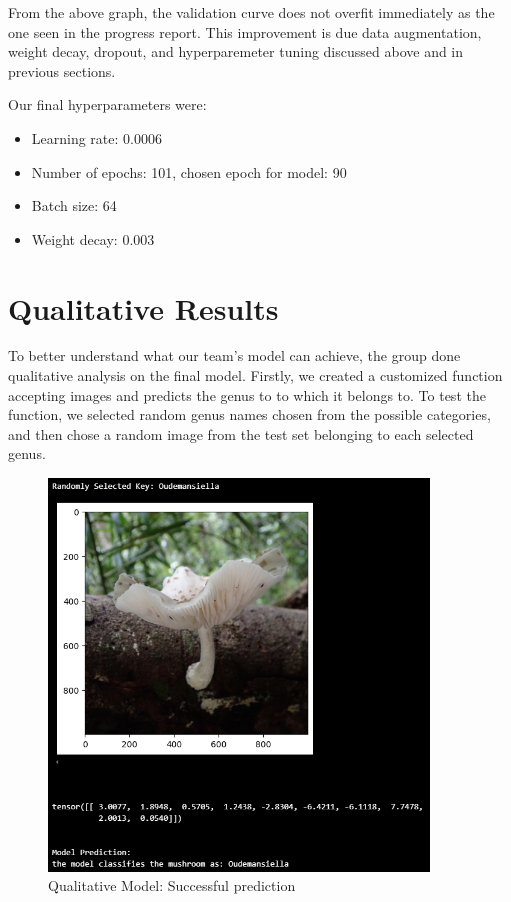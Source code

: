\documentclass{article} %
\begin{document}
From the above graph, the validation curve does not overfit immediately as the one seen in the progress report. This improvement is due data augmentation, weight decay, dropout, and hyperparemeter tuning discussed above and in previous sections. 

Our final hyperparameters were:
\begin{itemize}
    \item Learning rate: 0.0006
    \item Number of epochs: 101, chosen epoch for model: 90
    \item Batch size: 64
    \item Weight decay: 0.003
\end{itemize}

\section{Qualitative Results}
\label{sec:qualitative_results}

To better understand what our team's model can achieve, the group done qualitative analysis on the final model. Firstly, we created a customized function accepting images and predicts the genus to to which it belongs to. To test the function, we selected random genus names chosen from the possible categories, and then chose a random image from the test set belonging to each selected genus.

\FloatBarrier
\begin{figure}[h]
    \begin{center}
    \includegraphics[width=0.9\textwidth]{figures/qualitativeResultImg1.png}
    \end{center}
    \caption{Qualitative Model: Successful prediction}
    \label{fig:goodPrediction}
\end{figure}
\FloatBarrier
\end{document}
